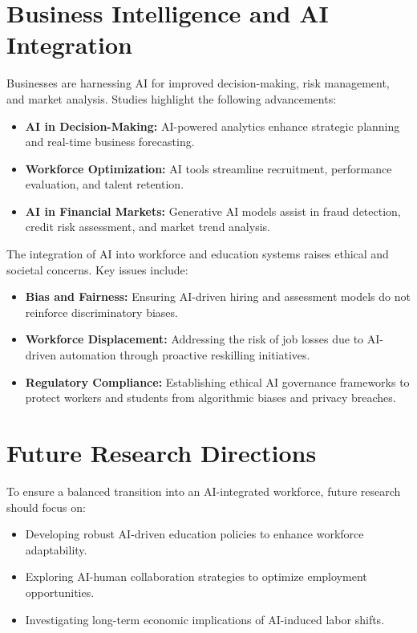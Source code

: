 \documentclass[a4paper,headinclude=on,footinclude=on,12pt,oneside]{scrbook}
\begin{document}
\section{Business Intelligence and AI Integration}

Businesses are harnessing AI for improved decision-making, risk management, and market analysis. Studies highlight the following advancements:
\begin{itemize}
	\item \textbf{AI in Decision-Making:} AI-powered analytics enhance strategic planning and real-time business forecasting.
	\item \textbf{Workforce Optimization:} AI tools streamline recruitment, performance evaluation, and talent retention.
	\item \textbf{AI in Financial Markets:} Generative AI models assist in fraud detection, credit risk assessment, and market trend analysis.
\end{itemize}


The integration of AI into workforce and education systems raises ethical and societal concerns. Key issues include:
\begin{itemize}
	\item \textbf{Bias and Fairness:} Ensuring AI-driven hiring and assessment models do not reinforce discriminatory biases.
	\item \textbf{Workforce Displacement:} Addressing the risk of job losses due to AI-driven automation through proactive reskilling initiatives.
	\item \textbf{Regulatory Compliance:} Establishing ethical AI governance frameworks to protect workers and students from algorithmic biases and privacy breaches.
\end{itemize}

\section{Future Research Directions}

To ensure a balanced transition into an AI-integrated workforce, future research should focus on:
\begin{itemize}
	\item Developing robust AI-driven education policies to enhance workforce adaptability.
	\item Exploring AI-human collaboration strategies to optimize employment opportunities.
	\item Investigating long-term economic implications of AI-induced labor shifts.
\end{itemize}
\end{document}
